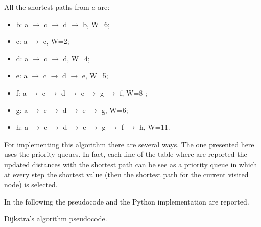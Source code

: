 All the shortest paths from \(a\) are:
\begin{itemize}
\item b: a \(\rightarrow\) c \(\rightarrow\) d \(\rightarrow\) b, W=6;
\item c: a \(\rightarrow\) c, W=2;
\item d: a \(\rightarrow\) c \(\rightarrow\) d, W=4;
\item e: a \(\rightarrow\) c \(\rightarrow\) d \(\rightarrow\) e, W=5;
\item f: a \(\rightarrow\) c \(\rightarrow\) d \(\rightarrow\) e \(\rightarrow\) g \(\rightarrow\) f, W=8 ;
\item g: a \(\rightarrow\) c \(\rightarrow\) d \(\rightarrow\) e \(\rightarrow\) g, W=6;
\item h: a \(\rightarrow\) c \(\rightarrow\) d \(\rightarrow\) e \(\rightarrow\) g \(\rightarrow\) f \(\rightarrow\) h, W=11.
\end{itemize}

For implementing this algorithm there are several ways. The one presented here uses the priority queues. In fact, each line of the table where are reported the updated distances with the shortest path can be see as a priority queue in which at every step the shortest value (then the shortest path for the current visited node) is selected.

In the following the pseudocode \cite{wikidijkstra} and the Python implementation \cite{stackdijkstra} are reported.

\begin{algorithm}[H]
	\DontPrintSemicolon
	\LinesNumbered
\caption{Dijkstra's algorithm pseudocode.}
\end{algorithm}

